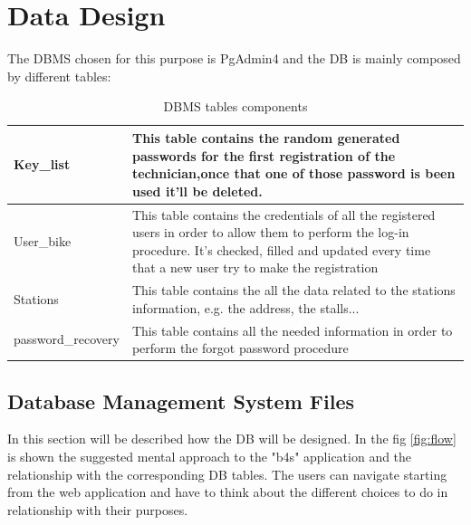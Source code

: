 \documentclass{article}
\begin{document}
\section{Data Design}
The DBMS chosen for this purpose is PgAdmin4 and the DB is mainly composed by different tables:
\begin{table} [H]
    \begin{center}
        \begin{tabular}{|l|p{}|}
            \hline
            Key\_list &  This table contains the random generated passwords for the first registration of the technician,once that one of those password is been used it’ll be deleted. \\ 
            \hline
            User\_bike  & This table contains the credentials of all the registered users in order to allow them to perform the log-in procedure. It’s checked, filled and updated every time that a new user try to make the registration  
            \\
            \hline
            Stations & This table contains the all the data related to the stations information, e.g. the address, the stalls...
            \\
            \hline
            password\_recovery & This table contains all the needed information in order to perform the forgot password procedure
            \\
            \hline
        \end{tabular}
    \end{center}
\caption{DBMS tables components}
\end{table}
\newpage
\subsection{Database Management System Files}
In this section will be described how the DB will be designed. 
In the fig \ref{fig:flow} is shown the suggested mental approach to the "b4s" application and the relationship with the corresponding DB tables. The users can navigate starting from the web application and have to think about the different choices to do in relationship with their purposes. 
\end{document}
